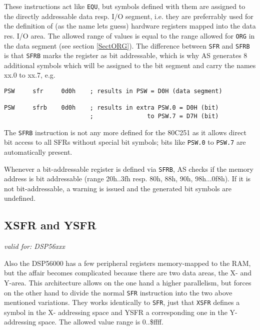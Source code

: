 \documentclass[12pt,twoside]{report}
\makeatletter
\newcommand{\tty}[1]{{\tt #1}}
\newcommand{\ttindex}[1]{\index{#1@{\tt #1}}}
\makeatother
\begin{document}
These instructions act like \tty{EQU}, but symbols defined with them are
assigned to the directly addressable data resp. I/O segment, i.e. they are
preferrably used for the definition of (as the name lets guess) hardware
registers mapped into the data res. I/O area.  The allowed range of values
is equal to the range allowed for \tty{ORG} in the data segment (see
section \ref{SectORG}).  The difference between \tty{SFR} and \tty{SFRB}
is that \tty{SFRB} marks the register as bit addressable, which is why AS
generates 8 additional symbols which will be assigned to the bit segment
and carry the names xx.0 to xx.7, e.g.
\begin{verbatim}
PSW     sfr     0d0h    ; results in PSW = D0H (data segment)

PSW     sfrb    0d0h    ; results in extra PSW.0 = D0H (bit)
                        ;               to PSW.7 = D7H (bit)
\end{verbatim}
The \tty{SFRB} instruction is not any more defined for the 80C251 as it
allows direct bit access to all SFRs without special bit symbols; bits
like \tty{PSW.0} to \tty{PSW.7} are automatically present.

Whenever a bit-addressable register is defined via \tty{SFRB}, AS checks
if the memory address is bit addressable (range 20h..3fh resp. 80h, 88h,
90h, 98h...0f8h).  If it is not bit-addressable, a warning is issued and
the generated bit symbols are undefined.


\subsection{XSFR and YSFR}
\ttindex{XSFR}\ttindex{YSFR}

{\em valid for: DSP56xxx}

Also the DSP56000 has a few peripheral registers memory-mapped to the RAM,
but the affair becomes complicated because there are two data areas, the
X- and Y-area.  This architecture allows on the one hand a higher
parallelism, but forces on the other hand to divide the normal \tty{SFR}
instruction into the two above mentioned variations.  They works
identically to \tty{SFR}, just that \tty{XSFR} defines a symbol in the X-
addressing space and YSFR a corresponding one in the Y-addressing space.
The allowed value range is 0..\$ffff.

\end{document}
